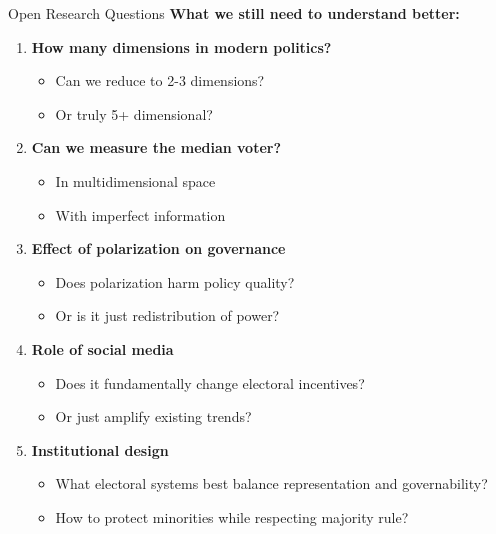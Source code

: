 \documentclass[10pt]{beamer}
\begin{document}
\begin{frame}{Open Research Questions}
\textbf{What we still need to understand better:}


\begin{enumerate}
\item \textbf{How many dimensions in modern politics?}
\begin{itemize}
\item Can we reduce to 2-3 dimensions?
\item Or truly 5+ dimensional?
\end{itemize}


\item \textbf{Can we measure the median voter?}
\begin{itemize}
\item In multidimensional space
\item With imperfect information
\end{itemize}


\item \textbf{Effect of polarization on governance}
\begin{itemize}
\item Does polarization harm policy quality?
\item Or is it just redistribution of power?
\end{itemize}


\item \textbf{Role of social media}
\begin{itemize}
\item Does it fundamentally change electoral incentives?
\item Or just amplify existing trends?
\end{itemize}


\item \textbf{Institutional design}
\begin{itemize}
\item What electoral systems best balance representation and governability?
\item How to protect minorities while respecting majority rule?
\end{itemize}
\end{enumerate}
\end{frame}
\end{document}
